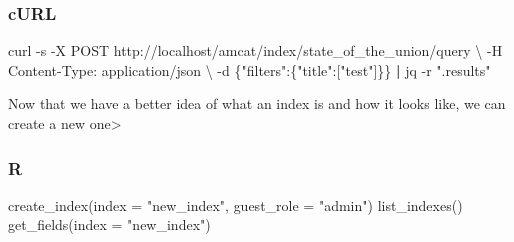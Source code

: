 \documentclass[
  letterpaper,
  DIV=11,
  numbers=noendperiod]{scrreprt}
\newenvironment{Shaded}{\begin{snugshade}}{\end{snugshade}}
\newcommand{\AttributeTok}[1]{\textcolor[rgb]{0.40,0.45,0.13}{#1}}
\newcommand{\DataTypeTok}[1]{\textcolor[rgb]{0.68,0.00,0.00}{#1}}
\newcommand{\ExtensionTok}[1]{\textcolor[rgb]{0.00,0.23,0.31}{#1}}
\newcommand{\FunctionTok}[1]{\textcolor[rgb]{0.28,0.35,0.67}{#1}}
\newcommand{\KeywordTok}[1]{\textcolor[rgb]{0.00,0.23,0.31}{\textbf{#1}}}
\newcommand{\NormalTok}[1]{\textcolor[rgb]{0.00,0.23,0.31}{#1}}
\newcommand{\OperatorTok}[1]{\textcolor[rgb]{0.37,0.37,0.37}{#1}}
\newcommand{\StringTok}[1]{\textcolor[rgb]{0.13,0.47,0.30}{#1}}
\newcommand{\VariableTok}[1]{\textcolor[rgb]{0.07,0.07,0.07}{#1}}
\begin{document}
\subsubsection{cURL}

\begin{Shaded}
\end{Shaded}

\begin{Shaded}
\begin{Highlighting}[]
\ExtensionTok{curl} \AttributeTok{{-}s} \AttributeTok{{-}X}\NormalTok{ POST http://localhost/amcat/index/state\_of\_the\_union/query }\DataTypeTok{\textbackslash{}}
  \AttributeTok{{-}H} \StringTok{\textquotesingle{}Content{-}Type: application/json\textquotesingle{}} \DataTypeTok{\textbackslash{}}
  \AttributeTok{{-}d} \StringTok{\textquotesingle{}\{"filters":\{"title":["test"]\}\}\textquotesingle{}} \KeywordTok{|} \ExtensionTok{jq} \AttributeTok{{-}r} \StringTok{".results"}
\end{Highlighting}
\end{Shaded}

Now that we have a better idea of what an index is and how it looks
like, we can create a new one\textgreater{}

\subsubsection{R}

\begin{Shaded}
\begin{Highlighting}[]
\FunctionTok{create\_index}\NormalTok{(}\AttributeTok{index =} \StringTok{"new\_index"}\NormalTok{, }\AttributeTok{guest\_role =} \StringTok{"admin"}\NormalTok{)}
\FunctionTok{list\_indexes}\NormalTok{()}
\FunctionTok{get\_fields}\NormalTok{(}\AttributeTok{index =} \StringTok{"new\_index"}\NormalTok{)}
\end{Highlighting}
\end{Shaded}
\end{document}
